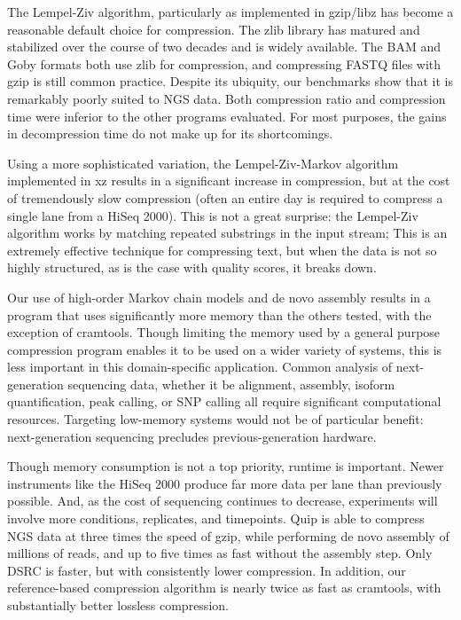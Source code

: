 \documentclass[twocolumn]{article}
\begin{document}

The Lempel-Ziv algorithm, particularly as implemented in gzip/libz has become
a reasonable default choice for compression. The zlib library has matured and stabilized
over the course of two decades and is widely available. The BAM and Goby
formats both use zlib for compression, and compressing FASTQ files with gzip
is still common practice. Despite its ubiquity, our benchmarks show that it is
remarkably poorly suited to NGS data. Both compression ratio and compression
time were inferior to the other programs evaluated. For most purposes, the
gains in decompression time do not make up for its shortcomings.

Using a more sophisticated variation, the Lempel-Ziv-Markov algorithm
implemented in xz results in a significant increase in compression, but at the
cost of tremendously slow compression (often an entire day is required to
compress a single lane from a HiSeq 2000). This is not a great surprise: the
Lempel-Ziv algorithm works by matching repeated substrings in the input
stream; This is an extremely effective technique for compressing text, but
when the data is not so highly structured, as is the case with quality scores,
it breaks down.




Our use of high-order Markov chain models and de novo assembly results in a
program that uses significantly more memory than the others tested, with the
exception of cramtools. Though limiting the memory used by a general purpose
compression program enables it to be used on a wider variety of systems, this
is less important in this domain-specific application. Common analysis of
next-generation sequencing data, whether it be alignment, assembly, isoform
quantification, peak calling, or SNP calling all require significant
computational resources. Targeting low-memory systems would not be of
particular benefit: next-generation sequencing precludes previous-generation
hardware.

Though memory consumption is not a top priority, runtime is important. Newer
instruments like the HiSeq 2000 produce far more data per lane than previously
possible. And, as the cost of sequencing continues to decrease, experiments
will involve more conditions, replicates, and timepoints.  Quip is able to
compress NGS data at three times the speed of gzip, while performing de novo
assembly of millions of reads, and up to five times as fast without the
assembly step. Only DSRC is faster, but with consistently lower compression.
In addition, our reference-based compression algorithm is nearly twice as fast
as cramtools, with substantially better lossless compression.
\end{document}

